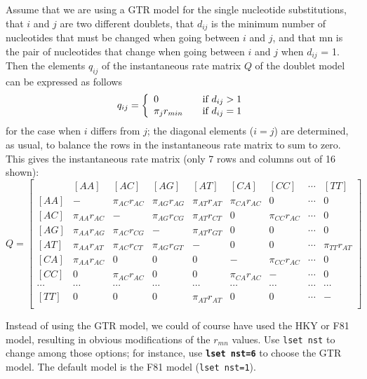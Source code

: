 \documentclass[12pt]{book}
\newcommand{\ttt}[1]{\texttt{#1}}
\newcommand{\tb}[1]{\ttt{\textbf{#1}}}
\begin{document}
Assume that we are using a GTR model for the single nucleotide substitutions, that $i$ and $j$ are
two different doublets, that $d_{ij}$ is the minimum number of nucleotides that must be changed
when going between $i$ and $j$, and that mn is the pair of nucleotides that change when going
between $i$ and $j$ when $d_{ij}$ = 1. Then the elements $q_{ij}$ of the instantaneous rate matrix
$Q$ of the doublet model can be expressed as follows
\[
q_{ij} = \left\{
\begin{array}{l l}
  0 & \quad \text{if} ~d_{ij}>1 \\
 \pi_j r_{min} & \quad \text{if} ~d_{ij}=1\\
\end{array} \right.
\]
for the case when $i$ differs from $j$; the diagonal elements ($i = j$) are determined, as usual,
to balance the rows in the instantaneous rate matrix to sum to zero. This gives the
instantaneous rate matrix (only 7 rows and columns out of 16 shown):
\footnotesize
\[
Q=\begin{bmatrix}
    & [AA] & [AC] & [AG] & [AT] & [CA] & [CC] & \cdots & [TT]\\
 [AA]& - & \pi_{AC} r_{AC} & \pi_{AG} r_{AG} & \pi_{AT} r_{AT}& \pi_{CA} r_{AC} & 0 & \cdots & 0\\
 [AC]& \pi_{AA} r_{AC} & - & \pi_{AG} r_{CG} & \pi_{AT} r_{CT}& 0 & \pi_{CC} r_{AC} & \cdots & 0\\
 [AG]& \pi_{AA} r_{AG} & \pi_{AC} r_{CG} & - & \pi_{AT} r_{GT}& 0 & 0 & \cdots & 0 \\
 [AT]& \pi_{AA} r_{AT} & \pi_{AC} r_{CT} & \pi_{AG} r_{GT}& -& 0 & 0 & \cdots &  \pi_{TT} r_{AT}\\
 [CA]& \pi_{AA} r_{AC} & 0 & 0 & 0 & - &  \pi_{CC} r_{AC} & \cdots & 0\\
 [CC]& 0 & \pi_{AC} r_{AC} & 0 & 0 & \pi_{CA} r_{AC} & -  & \cdots & 0\\
 \cdots& \cdots& \cdots& \cdots& \cdots& \cdots& \cdots& \cdots& \cdots\\
 [TT]& 0 & 0 & 0 &\pi_{AT} r_{AT} & 0 & 0 & \cdots & -\\
\end{bmatrix}
\]
\normalsize

Instead of using the GTR model, we could of course have used the HKY or F81 model, resulting in
obvious modifications of the $r_{mn}$ values. Use \ttt{lset nst} to change among those options; for
instance, use \tb{lset nst=6} to choose the GTR model. The default model is the F81 model
(\ttt{lset nst=1}).
\end{document}
